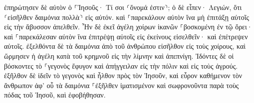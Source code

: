 \documentclass{openreader}
\begin{document}
ἐπηρώτησεν δὲ αὐτὸν ὁ ⸀Ἰησοῦς· Τί σοι ⸂ὄνομά ἐστιν⸃; ὁ δὲ εἶπεν· Λεγιών, ὅτι ⸂εἰσῆλθεν δαιμόνια πολλὰ⸃ εἰς αὐτόν. 
καὶ ⸀παρεκάλουν αὐτὸν ἵνα μὴ ἐπιτάξῃ αὐτοῖς εἰς τὴν ἄβυσσον ἀπελθεῖν. 
Ἦν δὲ ἐκεῖ ἀγέλη χοίρων ἱκανῶν ⸀βοσκομένη ἐν τῷ ὄρει· καὶ ⸀παρεκάλεσαν αὐτὸν ἵνα ἐπιτρέψῃ αὐτοῖς εἰς ἐκείνους εἰσελθεῖν· καὶ ἐπέτρεψεν αὐτοῖς. 
ἐξελθόντα δὲ τὰ δαιμόνια ἀπὸ τοῦ ἀνθρώπου εἰσῆλθον εἰς τοὺς χοίρους, καὶ ὥρμησεν ἡ ἀγέλη κατὰ τοῦ κρημνοῦ εἰς τὴν λίμνην καὶ ἀπεπνίγη. 
Ἰδόντες δὲ οἱ βόσκοντες τὸ ⸀γεγονὸς ἔφυγον καὶ ἀπήγγειλαν εἰς τὴν πόλιν καὶ εἰς τοὺς ἀγρούς. 
ἐξῆλθον δὲ ἰδεῖν τὸ γεγονὸς καὶ ἦλθον πρὸς τὸν Ἰησοῦν, καὶ εὗρον καθήμενον τὸν ἄνθρωπον ἀφ’ οὗ τὰ δαιμόνια ⸀ἐξῆλθεν ἱματισμένον καὶ σωφρονοῦντα παρὰ τοὺς πόδας τοῦ Ἰησοῦ, καὶ ἐφοβήθησαν. 
\end{document}

